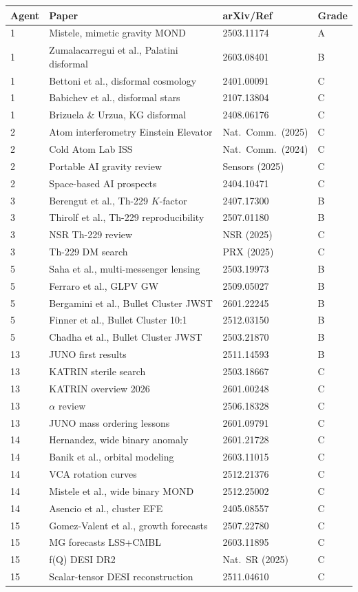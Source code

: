 \documentclass[11pt]{article}
\begin{document}
\begin{longtable}{p{}p{}p{}p{}}
\toprule
\textbf{Agent} & \textbf{Paper} & \textbf{arXiv/Ref} & \textbf{Grade} \\
\midrule
\endhead
1 & Mistele, mimetic gravity MOND & 2503.11174 & A \\
1 & Zumalacarregui et al., Palatini disformal & 2603.08401 & B \\
1 & Bettoni et al., disformal cosmology & 2401.00091 & C \\
1 & Babichev et al., disformal stars & 2107.13804 & C \\
1 & Brizuela \& Urzua, KG disformal & 2408.06176 & C \\
\midrule
2 & Atom interferometry Einstein Elevator & Nat.\ Comm.\ (2025) & C \\
2 & Cold Atom Lab ISS & Nat.\ Comm.\ (2024) & C \\
2 & Portable AI gravity review & Sensors (2025) & C \\
2 & Space-based AI prospects & 2404.10471 & C \\
\midrule
3 & Berengut et al., Th-229 $K$-factor & 2407.17300 & B \\
3 & Thirolf et al., Th-229 reproducibility & 2507.01180 & B \\
3 & NSR Th-229 review & NSR (2025) & C \\
3 & Th-229 DM search & PRX (2025) & C \\
\midrule
5 & Saha et al., multi-messenger lensing & 2503.19973 & B \\
5 & Ferraro et al., GLPV GW & 2509.05027 & B \\
5 & Bergamini et al., Bullet Cluster JWST & 2601.22245 & B \\
5 & Finner et al., Bullet Cluster 10:1 & 2512.03150 & B \\
5 & Chadha et al., Bullet Cluster JWST & 2503.21870 & B \\
\midrule
13 & JUNO first results & 2511.14593 & B \\
13 & KATRIN sterile search & 2503.18667 & C \\
13 & KATRIN overview 2026 & 2601.00248 & C \\
13 & $\alpha$ review & 2506.18328 & C \\
13 & JUNO mass ordering lessons & 2601.09791 & C \\
\midrule
14 & Hernandez, wide binary anomaly & 2601.21728 & C \\
14 & Banik et al., orbital modeling & 2603.11015 & C \\
14 & VCA rotation curves & 2512.21376 & C \\
14 & Mistele et al., wide binary MOND & 2512.25002 & C \\
14 & Asencio et al., cluster EFE & 2405.08557 & C \\
\midrule
15 & Gomez-Valent et al., growth forecasts & 2507.22780 & C \\
15 & MG forecasts LSS+CMBL & 2603.11895 & C \\
15 & f(Q) DESI DR2 & Nat.\ SR (2025) & C \\
15 & Scalar-tensor DESI reconstruction & 2511.04610 & C \\
\bottomrule
\end{longtable}
\end{document}
